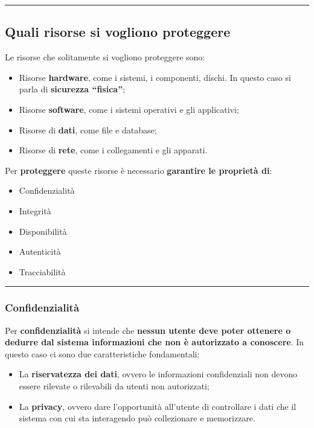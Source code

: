 \documentclass[a4paper]{article}
\newcommand{\longline}{\noindent\rule{\textwidth}{0.4pt}}
\newcommand{\dquotes}[1]{``#1''}
\begin{document}
	\longline
	
	\subsection{Quali risorse si vogliono proteggere}\label{quali risorse si vogliono proteggere}
	
	Le risorse che solitamente si vogliono proteggere sono:
	\begin{itemize}
		\item Risorse \textbf{hardware}, come i sistemi, i componenti, dischi. In questo caso si parla di \textbf{sicurezza \dquotes{fisica}};
		
		\item Risorse \textbf{software}, come i sistemi operativi e gli applicativi;
		
		\item Risorse di \textbf{dati}, come file e database;
		
		\item Risorse di \textbf{rete}, come i collegamenti e gli apparati.
	\end{itemize}
	Per \textcolor{Red3}{\textbf{proteggere}} queste risorse è necessario \textbf{garantire le proprietà di}:
	\begin{itemize}
		\item Confidenzialità
		\item Integrità
		\item Disponibilità
		\item Autenticità
		\item Tracciabilità
	\end{itemize}
	
	\longline
	
	\subsubsection{Confidenzialità}
	
	Per \textcolor{Red3}{\textbf{confidenzialità}} si intende che \textbf{nessun utente deve poter ottenere o dedurre dal sistema informazioni che non è autorizzato a conoscere}. In questo caso ci sono due caratteristiche fondamentali:
	\begin{itemize}
		\item La \textbf{riservatezza dei dati}, ovvero le informazioni confidenziali non devono essere rilevate o rilevabili da utenti non autorizzati;
		
		\item La \textbf{privacy}, ovvero dare l'opportunità all'utente di controllare i dati che il sistema con cui sta interagendo può collezionare e memorizzare.
	\end{itemize}\newpage
		
\end{document}
